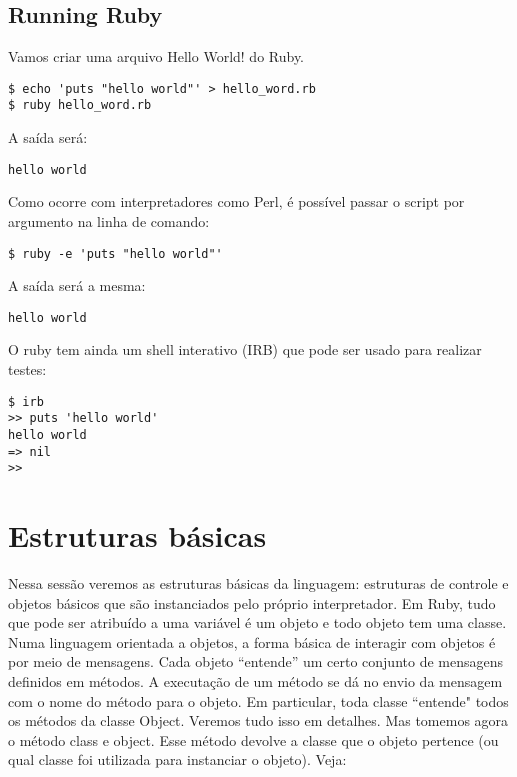 \documentclass[serif,mathserif]{article}
\begin{document}
\subsection {Running Ruby}

Vamos criar uma arquivo Hello World! do Ruby.

\begin{lstlisting}[style=BashInputStyle]
$ echo 'puts "hello world"' > hello_word.rb
$ ruby hello_word.rb
\end{lstlisting}

A saída será: 

\begin{lstlisting}[style=BashOutputStyle]
hello world
\end{lstlisting}

Como ocorre com interpretadores como Perl, é possível passar o script por argumento na linha de comando:

\begin{lstlisting}[style=BashInputStyle]
$ ruby -e 'puts "hello world"'
\end{lstlisting}

A saída será a mesma:

\begin{lstlisting}[style=BashOutputStyle]
hello world
\end{lstlisting}

O ruby tem ainda um shell interativo (IRB) que pode ser usado para realizar testes:


\begin{lstlisting}[style=BashInputStyle]
$ irb
>> puts 'hello world'
hello world
=> nil
>>
\end{lstlisting}

\section{Estruturas básicas}

Nessa sessão veremos as estruturas básicas da linguagem: estruturas de controle e objetos básicos que são instanciados pelo próprio interpretador. Em Ruby, 
tudo que pode ser atribuído a uma variável é um objeto e todo objeto tem uma classe. Numa linguagem orientada a objetos, a forma básica de interagir com 
objetos é por meio de mensagens. Cada objeto ``entende'' um certo conjunto de mensagens definidos em métodos. A executação de um método se dá no envio da mensagem 
com o nome do método para o objeto. Em particular, toda classe ``entende" todos os métodos da classe Object. Veremos tudo isso em detalhes. Mas tomemos agora 
o método class e object. Esse método devolve a classe que o objeto pertence (ou qual classe foi utilizada para instanciar o objeto). Veja:
 
\end{document}
